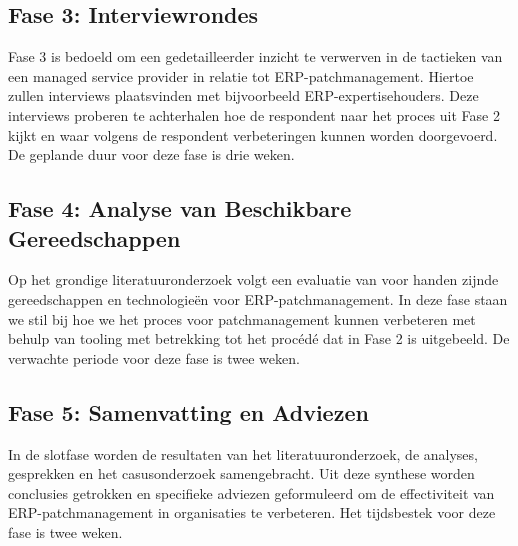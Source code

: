 \subsection{Fase 3: Interviewrondes}
Fase 3 is bedoeld om een gedetailleerder inzicht te verwerven in de tactieken van een managed service provider in relatie tot ERP-patchmanagement. Hiertoe zullen interviews plaatsvinden met bijvoorbeeld ERP-expertisehouders. Deze interviews proberen te achterhalen hoe de respondent naar het proces uit Fase 2 kijkt en waar volgens de respondent verbeteringen kunnen worden doorgevoerd. De geplande duur voor deze fase is drie weken.
\subsection{Fase 4: Analyse van Beschikbare Gereedschappen}
Op het grondige literatuuronderzoek volgt een evaluatie van voor handen zijnde gereedschappen en technologieën voor ERP-patchmanagement. In deze fase staan we stil bij hoe we het proces voor patchmanagement kunnen verbeteren met behulp van tooling met betrekking tot het procédé dat in Fase 2 is uitgebeeld. De verwachte periode voor deze fase is twee weken.
\subsection{Fase 5: Samenvatting en Adviezen}
In de slotfase worden de resultaten van het literatuuronderzoek, de analyses, gesprekken en het casusonderzoek samengebracht. Uit deze synthese worden conclusies getrokken en specifieke adviezen geformuleerd om de effectiviteit van ERP-patchmanagement in organisaties te verbeteren. Het tijdsbestek voor deze fase is twee weken. \